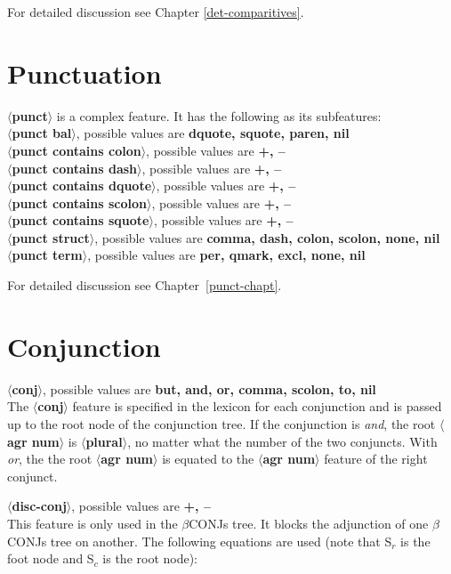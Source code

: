 For detailed discussion see Chapter \ref{det-comparitives}.

\section{Punctuation}
{\bf $\langle$punct$\rangle$} is a complex feature. It has the following
as its subfeatures:\\
{\bf $\langle$punct bal$\rangle$}, possible values are {\bf dquote,
squote, paren, nil}\\
{\bf $\langle$punct contains colon$\rangle$}, possible values are {\bf +, --}\\
{\bf $\langle$punct contains dash$\rangle$}, possible values are {\bf +, --}\\
{\bf $\langle$punct contains dquote$\rangle$}, possible values are {\bf +, --}\\
{\bf $\langle$punct contains scolon$\rangle$}, possible values are {\bf +, --}\\
{\bf $\langle$punct contains squote$\rangle$}, possible values are {\bf +, --}\\
{\bf $\langle$punct struct$\rangle$}, possible values are {\bf comma,
dash, colon, scolon, none, nil}\\
{\bf $\langle$punct term$\rangle$}, possible values are {\bf per, qmark, excl, 
none, nil}

For detailed discussion see Chapter~\ref{punct-chapt}.


\section{Conjunction}
{\bf $\langle$conj$\rangle$}, possible values are {\bf but, and, or,
comma, scolon, to, nil}\\
The {\bf $\langle$conj$\rangle$} feature is specified in the lexicon
for each conjunction and is passed up to the root node 
of the conjunction tree. If the conjunction is {\em and}, the 
root {\bf $\langle$agr num$\rangle$} is {\bf $\langle$plural$\rangle$}, no
matter what the number of the two conjuncts. With {\em or}, the
the root {\bf $\langle$agr num$\rangle$} is equated to the
{\bf $\langle$agr num$\rangle$} feature of the right conjunct. 


{\bf $\langle$disc-conj$\rangle$}, possible values are {\bf +, --}\\
This feature is only used in the $\beta$CONJs tree.
It blocks the adjunction of one $\beta$CONJs tree on another.
The following equations are used (note that S$_{r}$ is the foot node
and S$_{c}$ is the root node):


